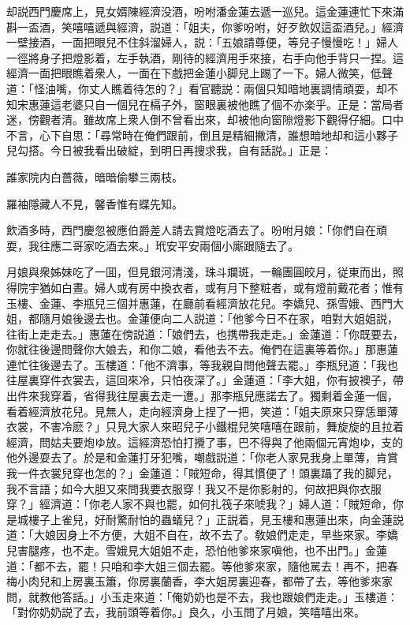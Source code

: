却説西門慶席上，見女婿陳經濟没酒，吩咐潘金蓮去遞一巡兒。這金蓮連忙下來滿斟一盃酒，笑嘻嘻遞與經濟，説道：「姐夫，你爹吩咐，好歹飲奴這盃酒兒。」經濟一壁接酒，一面把眼兒不住斜溜婦人，説：「五娘請尊便，等兒子慢慢吃！」婦人一徑將身子把燈影着，左手執酒，剛待的經濟用手來接，右手向他手背只一捏。這經濟一面把眼瞧着衆人，一面在下戲把金蓮小脚兒上踢了一下。婦人微笑，低聲道：「怪油嘴，你丈人瞧着待怎的？」看官聽説：兩個只知暗地裏調情頑耍，却不知宋惠蓮這老婆只自一個兒在槅子外，窗眼裏被他瞧了個不亦楽乎。正是：當局者迷，傍觀者清。雖故席上衆人倒不曾看出來，却被他向窗隙燈影下觀得仔細。口中不言，心下自思：「尋常時在俺們跟前，倒且是精細撇清，誰想暗地却和這小夥子兒勾搭。今日被我看出破綻，到明日再搜求我，自有話説。」正是：

誰家院内白薔薇，暗暗偷攀三兩枝。

羅袖隱藏人不見，馨香惟有蝶先知。

飲酒多時，西門慶忽被應伯爵差人請去賞燈吃酒去了。吩咐月娘：「你們自在頑耍，我往應二哥家吃酒去來。」玳安平安兩個小廝跟隨去了。

月娘與衆姊妹吃了一囬，但見銀河清淺，珠斗斕斑，一輪團圓皎月，従東而出，照得院宇猶如白晝。婦人或有房中換衣者，或有月下整粧者，或有燈前戴花者；惟有玉樓、金蓮、李瓶兒三個并惠蓮，在廳前看經濟放花兒。李嬌兒、孫雪娥、西門大姐，都隨月娘後邊去也。金蓮便向二人説道：「他爹今日不在家，咱對大姐姐説，往街上走走去。」惠蓮在傍説道：「娘們去，也携帶我走走。」金蓮道：「你既要去，你就往後邊問聲你大娘去，和你二娘，看他去不去。俺們在這裏等着你。」那惠蓮連忙往後邊去了。玉樓道：「他不濟事，等我親自問他聲去罷。」李瓶兒道：「我也往屋裏穿件衣裳去，這回來冷，只怕夜深了。」金蓮道：「李大姐，你有披襖子，帶出件來我穿着，省得我往屋裏去走一遭。」那李瓶兒應諾去了。獨剩着金蓮一個，看着經濟放花兒。見無人，走向經濟身上捏了一把，笑道：「姐夫原來只穿恁單薄衣裳，不害冷麽？」只見大家人來昭兒子小鐵棍兒笑嘻嘻在跟前，舞旋旋的且拉着經濟，問姑夫要炮ゆ放。這經濟恐怕打攪了事，巴不得與了他兩個元宵炮ゆ，支的他外邊耍去了。於是和金蓮打牙犯嘴，嘲戲説道：「你老人家見我身上單薄，肯賞我一件衣裳兒穿也怎的？」金蓮道：「賊短命，得其慣便了！頭裏躡了我的脚兒，我不言語；如今大胆又來問我要衣服穿！我又不是你影射的，何故把與你衣服穿？」經濟道：「你老人家不與也罷，如何扎筏子來唬我？」婦人道：「賊短命，你是城樓子上雀兒，好耐驚耐怕的蟲蟻兒？」正説着，見玉樓和惠蓮出來，向金蓮説道：「大娘因身上不方便，大姐不自在，故不去了。敎娘們走走，早些來家。李嬌兒害腿疼，也不走。雪娥見大姐姐不走，恐怕他爹來家嗔他，也不出門。」金蓮道：「都不去，罷！只咱和李大姐三個去罷。等他爹來家，隨他駡去！再不，把春梅小肉兒和上房裏玉簫，你房裏蘭香，李大姐房裏迎春，都帶了去，等他爹來家問，就教他答話。」小玉走來道：「俺奶奶也是不去，我也跟娘們走走。」玉樓道：「對你奶奶説了去，我前頭等着你。」良久，小玉問了月娘，笑嘻嘻出來。

